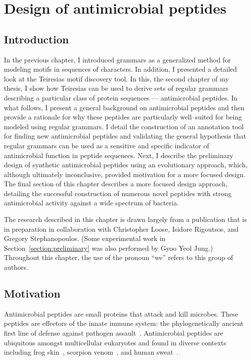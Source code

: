 
\chapter{Design of antimicrobial peptides}\label{chapter:amps}

\section{Introduction}
    In the previous chapter, I introduced grammars as a generalized
    method for modeling motifs in sequences of characters.  In
    addition, I presented a detailed look at the Teiresias motif
    discovery tool.  In this, the second chapter of my thesis, I
    show how Teiresias can be used to derive sets of regular
    grammars describing a particular class of protein sequences ---
    antimicrobial peptides.  In what follows, I present a general
    background on antimicrobial peptides and then provide a
    rationale for why these peptides are particularly well--suited
    for being modeled using regular grammars.  I detail the
    construction of an annotation tool for finding new antimicrobial
    peptides and validating the general hypothesis that regular
    grammars can be used as a sensitive and specific indicator of
    antimicrobial function in peptide sequences.  Next, I describe
    the preliminary design of synthetic antimicrobial peptides using
    an evolutionary approach, which, although ultimately inconclusive, provided
    motivation for a more focused design.  The final section of this
    chapter describes a more focused design approach, detailing the
    successful construction of numerous novel peptides with strong
    antimicrobial activity against a wide spectrum of bacteria.

    The research described in this chapter is drawn
    largely from a publication that is in preparation
    in collaboration with Christopher Loose, Isidore
    Rigoutsos, and Gregory Stephanopoulos.  (Some
    experimental work in Section~\vref{section:preliminary}
    was also performed by Gyoo Yeol Jung.)  Throughout this
    chapter, the use of the pronoun ``we'' refers to this
    group of authors.

\section{Motivation}
    Antimicrobial peptides are small
    proteins that attack and kill microbes.
    These peptides are effectors of the
    innate immune system: the phylogenetically
    ancient first line of defense against pathogen
    assault~\cite{rolff2003invertebrate,kimbrell2001evolution}.
    Antimicrobial peptides are ubiquitous
    amongst multicellular eukaryotes and
    found in diverse contexts including frog
    skin~\cite{simmaco1999antimicrobial}, scorpion
    venom~\cite{moerman2002antibacterial}, and human
    sweat~\cite{schittek2001dermcidin}.


